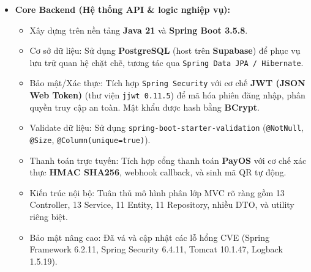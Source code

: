\documentclass[12pt,a4paper]{article}
\begin{document}
\begin{itemize}[leftmargin=*]
    \item \textbf{Core Backend (Hệ thống API \& logic nghiệp vụ):} 
    \begin{itemize}
        \item Xây dựng trên nền tảng \textbf{Java 21} và \textbf{Spring Boot 3.5.8}.
        \item Cơ sở dữ liệu: Sử dụng \textbf{PostgreSQL} (host trên \textbf{Supabase}) để phục vụ lưu trữ quan hệ chặt chẽ, tương tác qua \texttt{Spring Data JPA / Hibernate}.
        \item Bảo mật/Xác thực: Tích hợp \texttt{Spring Security} với cơ chế \textbf{JWT (JSON Web Token)} (thư viện \texttt{jjwt 0.11.5}) để mã hóa phiên đăng nhập, phân quyền truy cập an toàn. Mật khẩu được hash bằng \textbf{BCrypt}.
        \item Validate dữ liệu: Sử dụng \texttt{spring-boot-starter-validation} (\texttt{@NotNull}, \texttt{@Size}, \texttt{@Column(unique=true)}).
        \item Thanh toán trực tuyến: Tích hợp cổng thanh toán \textbf{PayOS} với cơ chế xác thực \textbf{HMAC SHA256}, webhook callback, và sinh mã QR tự động.
        \item Kiến trúc nội bộ: Tuân thủ mô hình phân lớp MVC rõ ràng gồm 13 Controller, 13 Service, 11 Entity, 11 Repository, nhiều DTO, và utility riêng biệt.
        \item Bảo mật nâng cao: Đã vá và cập nhật các lỗ hổng CVE (Spring Framework 6.2.11, Spring Security 6.4.11, Tomcat 10.1.47, Logback 1.5.19).
    \end{itemize}


\end{itemize}
\end{document}
